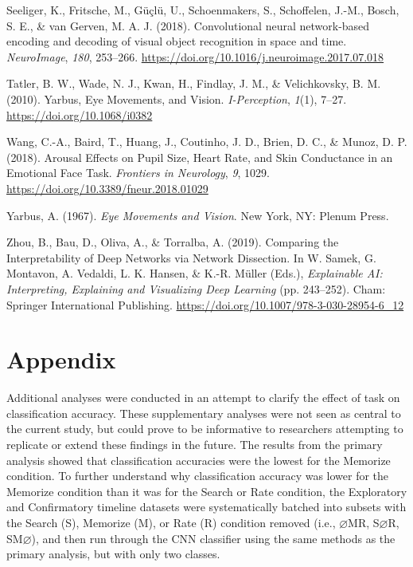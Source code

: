 \documentclass[
  english,
  man, donotrepeattitle,floatsintext]{apa6}
\begin{document}
\leavevmode\hypertarget{ref-seeligerConvolutionalNeuralNetworkbased2018a}{}%
Seeliger, K., Fritsche, M., Güçlü, U., Schoenmakers, S., Schoffelen, J.-M., Bosch, S. E., \& van Gerven, M. A. J. (2018). Convolutional neural network-based encoding and decoding of visual object recognition in space and time. \emph{NeuroImage}, \emph{180}, 253--266. \url{https://doi.org/10.1016/j.neuroimage.2017.07.018}

\leavevmode\hypertarget{ref-tatlerYarbusEyeMovements2010a}{}%
Tatler, B. W., Wade, N. J., Kwan, H., Findlay, J. M., \& Velichkovsky, B. M. (2010). Yarbus, Eye Movements, and Vision. \emph{I-Perception}, \emph{1}(1), 7--27. \url{https://doi.org/10.1068/i0382}

\leavevmode\hypertarget{ref-wangArousalEffectsPupil2018}{}%
Wang, C.-A., Baird, T., Huang, J., Coutinho, J. D., Brien, D. C., \& Munoz, D. P. (2018). Arousal Effects on Pupil Size, Heart Rate, and Skin Conductance in an Emotional Face Task. \emph{Frontiers in Neurology}, \emph{9}, 1029. \url{https://doi.org/10.3389/fneur.2018.01029}

\leavevmode\hypertarget{ref-yarbusEyeMovementsVision1967a}{}%
Yarbus, A. (1967). \emph{Eye Movements and Vision}. New York, NY: Plenum Press.

\leavevmode\hypertarget{ref-zhouComparingInterpretabilityDeep2019a}{}%
Zhou, B., Bau, D., Oliva, A., \& Torralba, A. (2019). Comparing the Interpretability of Deep Networks via Network Dissection. In W. Samek, G. Montavon, A. Vedaldi, L. K. Hansen, \& K.-R. Müller (Eds.), \emph{Explainable AI: Interpreting, Explaining and Visualizing Deep Learning} (pp. 243--252). Cham: Springer International Publishing. \url{https://doi.org/10.1007/978-3-030-28954-6_12}

\endgroup

\newpage

\section{Appendix}

Additional analyses were conducted in an attempt to clarify the effect of task on classification accuracy. These supplementary analyses were not seen as central to the current study, but could prove to be informative to researchers attempting to replicate or extend these findings in the future. The results from the primary analysis showed that classification accuracies were the lowest for the Memorize condition. To further understand why classification accuracy was lower for the Memorize condition than it was for the Search or Rate condition, the Exploratory and Confirmatory timeline datasets were systematically batched into subsets with the Search (S), Memorize (M), or Rate (R) condition removed (i.e., \(\varnothing\)MR, S\(\varnothing\)R, SM\(\varnothing\)), and then run through the CNN classifier using the same methods as the primary analysis, but with only two classes.
\end{document}
